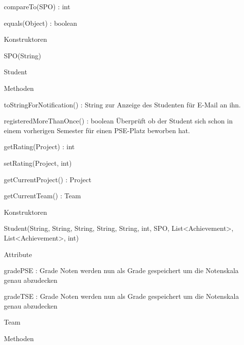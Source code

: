 \documentclass[parskip=full]{scrartcl}
\newcommand{\changeDescription}[1]{{\newline\color{black}\normalfont #1}}
\newcommand{\code}[1]{{\ttfamily #1}}
\begin{document}
\begin{itemPackage}
\begin{itemClass}
\begin{itemClassSub}
\begin{itemPlus}
\item compareTo(SPO) : int
\item equals(Object) : boolean
\end{itemPlus}
\item Konstruktoren
\begin{itemPlus}
\item SPO(String)
\end{itemPlus}
\end{itemClassSub}
\item Student
\begin{itemClassSub}
\item Methoden
\begin{itemPlus}
\item toStringForNotification() : String \changeDescription{\code{toString()}
zur Anzeige des Studenten für E-Mail an ihn.}
\item registeredMoreThanOnce() : boolean \changeDescription{Überprüft ob der
Student sich schon in einem vorherigen Semester für einen PSE-Platz beworben
hat.}
\end{itemPlus}
\begin{itemMinus}
\item getRating(Project) : int
\item setRating(Project, int)
\item getCurrentProject() : Project
\item getCurrentTeam() : Team
\end{itemMinus}
\item Konstruktoren
\begin{itemPlus}
\item Student(String, String, String, String, String, int, SPO,
List<Achievement>, List<Achievement>, int)
\end{itemPlus}
\item Attribute 
\begin{itemChange}
\item gradePSE : Grade \changeDescription{Noten werden nun als \code{Grade}
gespeichert um die Notenskala genau abzudecken}
\item gradeTSE : Grade \changeDescription{Noten werden nun als \code{Grade}
gespeichert um die Notenskala genau abzudecken}
\end{itemChange}
\end{itemClassSub}
\item Team
\begin{itemClassSub}
\item Methoden
\begin{itemPlus}

\end{itemPlus}
\end{itemClassSub}
\end{itemClass}
\end{itemPackage}
\end{document}
